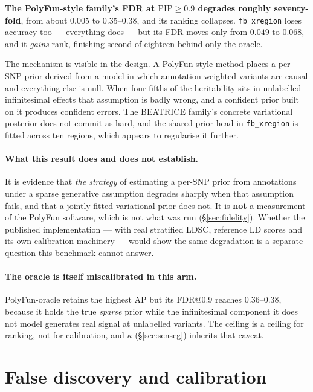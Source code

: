 \documentclass[11pt,a4paper]{article}
\newcommand{\pip}{\mathrm{PIP}}
\begin{document}
\textbf{The PolyFun-style family's FDR at $\pip\ge0.9$ degrades roughly seventy-fold},
from about $0.005$ to $0.35$--$0.38$, and its ranking collapses.
\texttt{fb\_xregion} loses accuracy too --- everything does --- but its FDR
moves only from $0.049$ to $0.068$, and it \emph{gains} rank, finishing second
of eighteen behind only the oracle.

The mechanism is visible in the design. A PolyFun-style method places a
per-SNP prior derived from a model in which annotation-weighted variants are
causal and everything else is null. When four-fifths of the heritability sits in
unlabelled infinitesimal effects that assumption is badly wrong, and a confident
prior built on it produces confident errors. The BEATRICE family's concrete
variational posterior does not commit as hard, and the shared prior head in
\texttt{fb\_xregion} is fitted across ten regions, which appears to regularise
it further.

\paragraph{What this result does and does not establish.} It is evidence that
\emph{the strategy} of estimating a per-SNP prior from annotations under a
sparse generative assumption degrades sharply when that assumption fails, and
that a jointly-fitted variational prior does not. It is \textbf{not} a
measurement of the PolyFun software, which is not what was run
(\S\ref{sec:fidelity}). Whether the published implementation --- with real
stratified LDSC, reference LD scores and its own calibration machinery --- would
show the same degradation is a separate question this benchmark cannot answer.

\paragraph{The oracle is itself miscalibrated in this arm.} PolyFun-oracle
retains the highest AP but its FDR@$0.9$ reaches $0.36$--$0.38$, because it
holds the true \emph{sparse} prior while the infinitesimal component it does not
model generates real signal at unlabelled variants. The ceiling is a ceiling for
ranking, not for calibration, and $\kappa$ (\S\ref{sec:senseg}) inherits that
caveat.

\section{False discovery and calibration}\label{sec:calibration}
\end{document}
